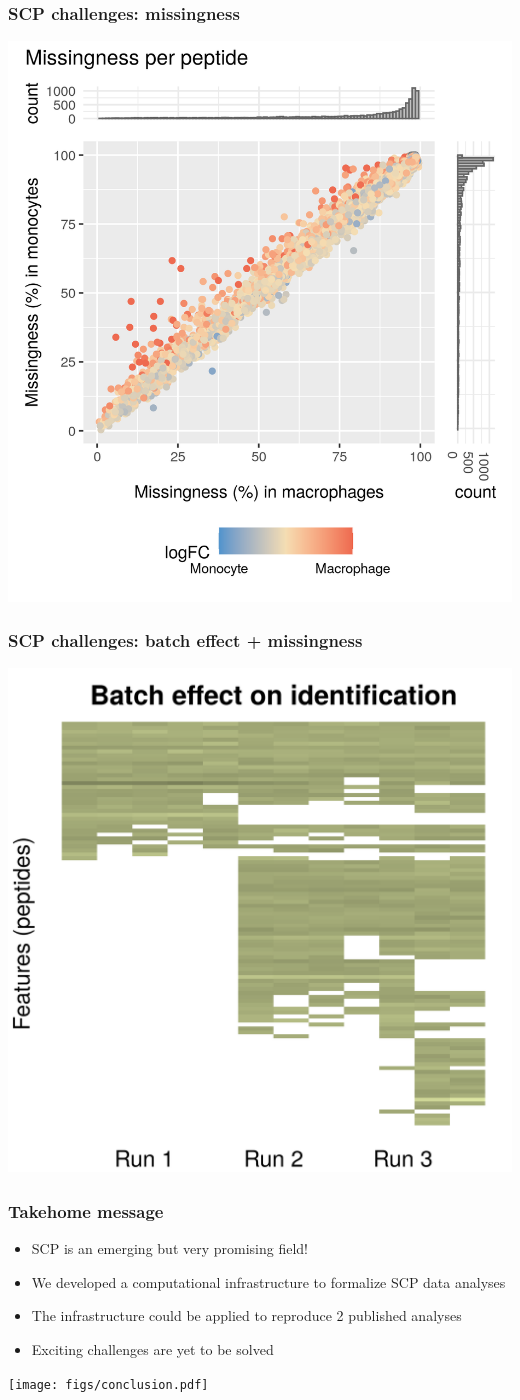 \documentclass{beamer}
\begin{document}
\begin{frame}
  \frametitle{SCP challenges: missingness}
  
  \centering
  \includegraphics[width=0.6\linewidth]{figs/missing_peptide.png}
  
\end{frame}


\begin{frame}
  \frametitle{SCP challenges: batch effect + missingness}
  
  \centering
  \includegraphics[width=0.6\linewidth]{figs/batch_effects.png}

\end{frame}

\begin{frame}
  \frametitle{Takehome message}
  
  \begin{itemize}
    \item SCP is an emerging but very promising field!
    \item We developed a computational infrastructure to formalize SCP
      data analyses
    \item The infrastructure could be applied to reproduce 2 published 
      analyses
    \item Exciting challenges are yet to be solved
  \end{itemize}
  
  \vfill
  \texttt{[image: figs/conclusion.pdf]}
  
\end{frame}
\end{document}
